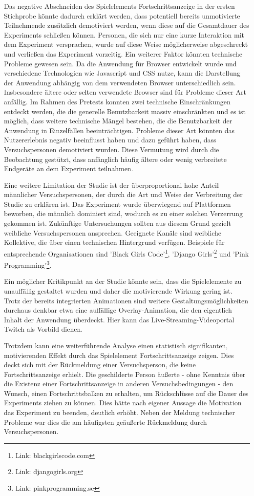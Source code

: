 Das negative Abschneiden des Spielelements Fortschrittsanzeige in der ersten Stichprobe könnte dadurch erklärt werden, dass potentiell bereits unmotivierte Teilnehmende zusätzlich demotiviert werden, wenn diese auf die Gesamtdauer des Experiments schließen können. Personen, die sich nur eine kurze Interaktion mit dem Experiment versprachen, wurde auf diese Weise möglicherweise abgeschreckt und verließen das Experiment vorzeitig. Ein weiterer Faktor könnten technische Probleme gewesen sein. Da die Anwendung für Browser entwickelt wurde und verschiedene Technologien wie Javascript und CSS nutze, kann die Darstellung der Anwendung abhängig von dem verwendeten Browser unterschiedlich sein. Insbesondere ältere oder selten verwendete Browser sind für Probleme dieser Art anfällig. Im Rahmen des Pretests konnten zwei technische Einschränkungen entdeckt werden, die die generelle Benutzbarkeit massiv einschränkten und es ist möglich, dass weitere technische Mängel bestehen, die die Benutzbarkeit der Anwendung in Einzelfällen beeinträchtigen. Probleme dieser Art könnten das Nutzererlebnis negativ beeinflusst haben und dazu geführt haben, dass Versuchspersonen demotiviert wurden. Diese Vermutung wird durch die Beobachtung gestützt, dass anfänglich häufig ältere oder wenig verbreitete Endgeräte an dem Experiment teilnahmen.

Eine weitere Limitation der Studie ist der überproportional hohe Anteil männlicher Versuchspersonen, der durch die Art und Weise der Verbreitung der Studie zu erklären ist. Das Experiment wurde überwiegend auf Plattformen beworben, die männlich dominiert sind, wodurch es zu einer solchen Verzerrung gekommen ist. Zukünftige Untersuchungen sollten aus diesem Grund gezielt weibliche Versuchspersonen ansprechen. Geeignete Kanäle sind weibliche Kollektive, die über einen technischen Hintergrund verfügen. Beispiele für entsprechende Organisationen sind 'Black Girls Code'\footnote{Link: blackgirlscode.com}, 'Django Girls'\footnote{Link: djangogirls.org} und 'Pink Programming'\footnote{Link: pinkprogramming.se}.

Ein möglicher Kritikpunkt an der Studie könnte sein, dass die Spielelemente zu unauffällig gestaltet wurden und daher die motivierende Wirkung gering ist. Trotz der bereits integrierten Animationen sind weitere Gestaltungsmöglichkeiten durchaus denkbar \textendash{} etwa eine auffällige Overlay-Animation, die den eigentlich Inhalt der Anwendung überdeckt. Hier kann das Live-Streaming-Videoportal Twitch als Vorbild dienen.

Trotzdem kann eine weiterführende Analyse einen statistisch signifikanten, motivierenden Effekt durch das Spielelement Fortschrittsanzeige zeigen. Dies deckt sich mit der Rückmeldung einer Versuchsperson, die keine Fortschrittsanzeige erhielt. Die geschilderte Person äußerte - ohne Kenntnis über die Existenz einer Fortschrittsanzeige in anderen Versuchsbedingungen - den Wunsch, einen Fortschrittsbalken zu erhalten, um Rückschlüsse auf die Dauer des Experiments ziehen zu können. Dies hätte nach eigener Aussage die Motivation das Experiment zu beenden, deutlich erhöht. Neben der Meldung technischer Probleme war dies die am häufigsten geäußerte Rückmeldung durch Versuchspersonen. 

